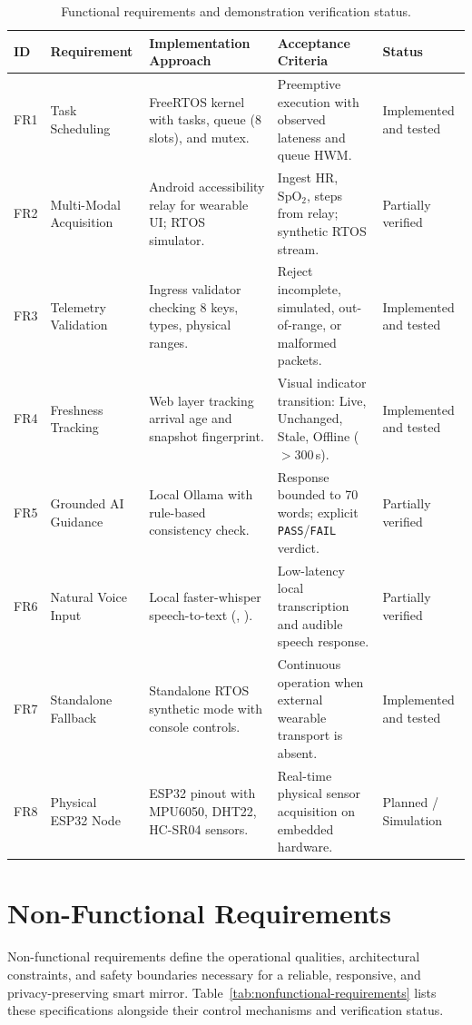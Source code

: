 \begin{table}[H]
\centering
\scriptsize
\renewcommand{\arraystretch}{0.98}
\caption{Functional requirements and demonstration verification status.}
\label{tab:functional-requirements}
\begin{tabularx}{\textwidth}{p{8mm}p{28mm}p{42mm}p{34mm}Y}
\toprule
\textbf{ID} & \textbf{Requirement} & \textbf{Implementation Approach} & \textbf{Acceptance Criteria} & \textbf{Status}\\
\midrule
FR1 & Task Scheduling & FreeRTOS kernel with tasks, queue (8 slots), and mutex. & Preemptive execution with observed lateness and queue HWM. & Implemented and tested\\
FR2 & Multi-Modal Acquisition & Android accessibility relay for wearable UI; RTOS simulator. & Ingest HR, $\mathrm{SpO_2}$, steps from relay; synthetic RTOS stream. & Partially verified\\
FR3 & Telemetry Validation & Ingress validator checking 8 keys, types, physical ranges. & Reject incomplete, simulated, out-of-range, or malformed packets. & Implemented and tested\\
FR4 & Freshness Tracking & Web layer tracking arrival age and snapshot fingerprint. & Visual indicator transition: Live, Unchanged, Stale, Offline ($>300$\,s). & Implemented and tested\\
FR5 & Grounded AI Guidance & Local Ollama  with rule-based consistency check. & Response bounded to 70 words; explicit \texttt{PASS}/\texttt{FAIL} verdict. & Partially verified\\
FR6 & Natural Voice Input & Local faster-whisper speech-to-text (, ). & Low-latency local transcription and audible speech response. & Partially verified\\
FR7 & Standalone Fallback & Standalone RTOS synthetic mode with console controls. & Continuous operation when external wearable transport is absent. & Implemented and tested\\
FR8 & Physical ESP32 Node & ESP32 pinout with MPU6050, DHT22, HC-SR04 sensors. & Real-time physical sensor acquisition on embedded hardware. & Planned / Simulation\\
\bottomrule
\end{tabularx}
\end{table}

\section{Non-Functional Requirements}
Non-functional requirements define the operational qualities, architectural constraints, and safety boundaries necessary for a reliable, responsive, and privacy-preserving smart mirror. Table~\ref{tab:nonfunctional-requirements} lists these specifications alongside their control mechanisms and verification status.

